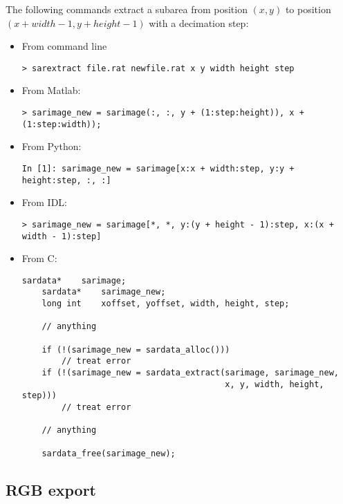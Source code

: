 \documentclass[10pt,french,english,a4paper]{article}
\begin{document}
The following commands extract a subarea
from position $(x, y)$ to position $(x + width - 1, y + height - 1)$
with a decimation step:
\begin{itemize}
\item From command line
  \begin{Verbatim}[frame=single]
    > sarextract file.rat newfile.rat x y width height step
  \end{Verbatim}
\item From Matlab:
  \begin{Verbatim}[frame=single]
    > sarimage_new = sarimage(:, :, y + (1:step:height)), x + (1:step:width));
  \end{Verbatim}
\item From Python:
  \begin{Verbatim}[frame=single]
    In [1]: sarimage_new = sarimage[x:x + width:step, y:y + height:step, :, :]

  \end{Verbatim}
\item From IDL:
  \begin{Verbatim}[frame=single]
    > sarimage_new = sarimage[*, *, y:(y + height - 1):step, x:(x + width - 1):step]
  \end{Verbatim}
\item From C:
  \begin{Verbatim}[frame=single]
    sardata*    sarimage;
    sardata*    sarimage_new;
    long int    xoffset, yoffset, width, height, step;

    // anything

    if (!(sarimage_new = sardata_alloc()))
        // treat error
    if (!(sarimage_new = sardata_extract(sarimage, sarimage_new,
                                         x, y, width, height, step)))
        // treat error

    // anything

    sardata_free(sarimage_new);
  \end{Verbatim}
\end{itemize}

\subsection{RGB export}
\end{document}
